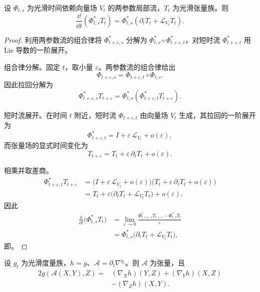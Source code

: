 \begin{proposition}[时间依赖张量的拉回微分]
设 $\Phi_{t,s}$ 为光滑时间依赖向量场 $V_t$ 的两参数局部流，$T_t$ 为光滑张量族。则\[\frac{\dd}{\dd t}(\Phi_{t,s}^*T_t)=\Phi_{t,s}^*(\partial_tT_t+\mathcal L_{V_t}T_t).\]
\end{proposition}

\begin{proof}
利用两参数流的组合律将 $\Phi_{t+\varepsilon,s}^*$ 分解为 $\Phi_{t,s}^*\circ\Phi_{t+\varepsilon,t}^*$，对短时流 $\Phi_{t+\varepsilon,t}^*$ 用 Lie 导数的一阶展开。

组合律分解。固定 $t$，取小量 $\varepsilon$。两参数流的组合律给出
\begin{equation*}
 \Phi_{t+\varepsilon,s}
 =\Phi_{t+\varepsilon,t}\circ\Phi_{t,s}.
\end{equation*}
因此拉回分解为
\begin{equation*}
 \Phi_{t+\varepsilon,s}^*T_{t+\varepsilon}
 =\Phi_{t,s}^*
 \left(\Phi_{t+\varepsilon,t}^*T_{t+\varepsilon}\right).
\end{equation*}

短时流展开。在时间 $t$ 附近，短时流 $\Phi_{t+\varepsilon,t}$ 由向量场 $V_t$ 生成，其拉回的一阶展开为
\begin{equation*}
 \Phi_{t+\varepsilon,t}^*
 =I+\varepsilon\,\mathcal L_{V_t}+o(\varepsilon),
\end{equation*}
而张量场的显式时间变化为
\begin{equation*}
 T_{t+\varepsilon}
 =T_t+\varepsilon\,\partial_tT_t+o(\varepsilon).
\end{equation*}

相乘并取差商。
\begin{align*}
 \Phi_{t+\varepsilon,t}^*T_{t+\varepsilon}
 &=\bigl(I+\varepsilon\,\mathcal L_{V_t}+o(\varepsilon)\bigr)
  \bigl(T_t+\varepsilon\,\partial_tT_t+o(\varepsilon)\bigr)\\
 &=T_t+\varepsilon
  \bigl(\partial_tT_t+\mathcal L_{V_t}T_t\bigr)+o(\varepsilon).
\end{align*}
因此
\begin{align*}
 \frac{\dd}{\dd t}\bigl(\Phi_{t,s}^*T_t\bigr)
 &=\lim_{\varepsilon\to0}\frac{\Phi_{t+\varepsilon,s}^*T_{t+\varepsilon}-\Phi_{t,s}^*T_t}{\varepsilon}\\
 &=\Phi_{t,s}^*
 \bigl(\partial_tT_t+\mathcal L_{V_t}T_t\bigr),
\end{align*}
即。
\end{proof}

\begin{proposition}
设 $g_t$ 为光滑度量族，$h=\dot g$、$\mathcal A=\partial_t\nabla^{g_t}$。则 $\mathcal A$ 为张量，且\[\begin{aligned}2g(\mathcal A(X,Y),Z)={}&(\nabla_Xh)(Y,Z)+(\nabla_Yh)(X,Z)\\&-(\nabla_Zh)(X,Y).\end{aligned}\]
\end{proposition}

